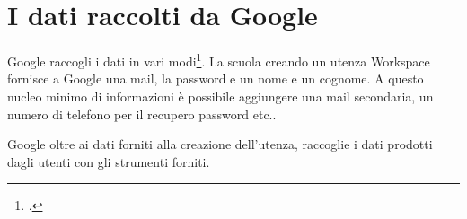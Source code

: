 \section{I dati raccolti da Google}
\textenglish{Google} raccogli i dati in vari modi\footcite{Google2022a}. La scuola creando un utenza Workspace fornisce a Google una mail, la password e un nome e un cognome. A questo nucleo minimo di informazioni è possibile aggiungere una mail secondaria, un numero di telefono per il recupero password etc..

Google oltre ai dati forniti alla creazione dell'utenza, raccoglie i dati prodotti dagli utenti con gli strumenti forniti. 